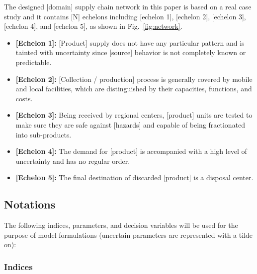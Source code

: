 \documentclass[10pt,twocolumn]{article}
\begin{document}
The designed [domain] supply chain network in this paper is based on
a real case study and it contains [N] echelons including [echelon 1],
[echelon 2], [echelon 3], [echelon 4], and [echelon 5], as shown
in Fig.~\ref{fig:network}.

\begin{itemize}
  \item \textbf{[Echelon 1]:} [Product] supply does not have any
        particular pattern and is tainted with uncertainty since
        [source] behavior is not completely known or predictable.

  \item \textbf{[Echelon 2]:} [Collection / production] process is
        generally covered by mobile and local facilities, which are
        distinguished by their capacities, functions, and costs.

  \item \textbf{[Echelon 3]:} Being received by regional centers,
        [product] units are tested to make sure they are safe against
        [hazards] and capable of being fractionated into sub-products.

  \item \textbf{[Echelon 4]:} The demand for [product] is accompanied
        with a high level of uncertainty and has no regular order.

  \item \textbf{[Echelon 5]:} The final destination of discarded
        [product] is a disposal center.
\end{itemize}

\subsection{Notations}

The following indices, parameters, and decision variables will be
used for the purpose of model formulations (uncertain parameters are
represented with a tilde on):

\subsubsection{Indices}
\end{document}

